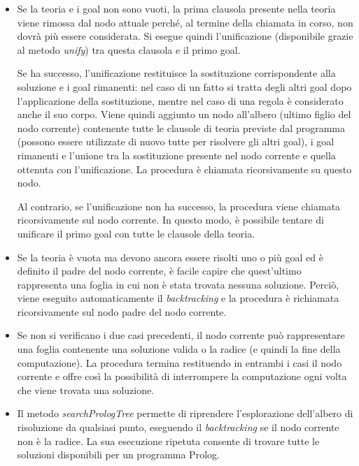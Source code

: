 \begin{itemize}
\item Se la teoria e i goal non sono vuoti, la prima clausola presente nella teoria viene rimossa dal nodo attuale perché, al termine della chiamata in corso, non dovrà più essere considerata. Si esegue quindi l'unificazione (disponibile grazie al metodo \textit{unify}) tra questa clausola e il primo goal.

Se ha successo, l'unificazione restituisce la sostituzione corrispondente alla soluzione e i goal rimanenti: nel caso di un fatto si tratta degli altri goal dopo l'applicazione della sostituzione, mentre nel caso di una regola è considerato anche il suo corpo. Viene quindi aggiunto un nodo all'albero (ultimo figlio del nodo corrente) contenente tutte le clausole di teoria previste dal programma (possono essere utilizzate di nuovo tutte per risolvere gli altri goal), i goal rimanenti e l'unione tra la sostituzione presente nel nodo corrente e quella ottenuta con l'unificazione. La procedura è chiamata ricorsivamente su questo nodo.

Al contrario, se l'unificazione non ha successo, la procedura viene chiamata ricorsivamente sul nodo corrente. In questo modo, è possibile tentare di unificare il primo goal con tutte le clausole della teoria.
\item Se la teoria è vuota ma devono ancora essere risolti uno o più goal ed è definito il padre del nodo corrente, è facile capire che quest'ultimo rappresenta una foglia in cui non è stata trovata nessuna soluzione. Perciò, viene eseguito automaticamente il \textit{backtracking} e la procedura è richiamata ricorsivamente sul nodo padre del nodo corrente.
\item Se non si verificano i due casi precedenti, il nodo corrente può rappresentare una foglia contenente una soluzione valida o la radice (e quindi la fine della computazione). La procedura termina restituendo in entrambi i casi il nodo corrente e offre così la possibilità di interrompere la computazione ogni volta che viene trovata una soluzione.
\item Il metodo \textit{searchPrologTree} permette di riprendere l'esplorazione dell'albero di risoluzione da qualsiasi punto, eseguendo il \textit{backtracking} se il nodo corrente non è la radice. La sua esecuzione ripetuta consente di trovare tutte le soluzioni disponibili per un programma Prolog.
\end{itemize}



